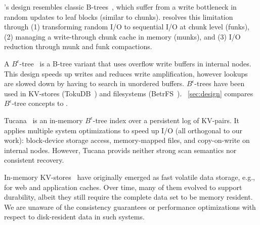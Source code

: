 \sys's design resembles classic B-trees~\cite{Knuth:1998:ACP:280635}, which suffer from a write bottleneck in random updates to 
leaf blocks (similar to chunks). \sys\/ resolves this limitation through (1) transforming random I/O to sequential I/O at chunk level
(funks), (2) managing a write-through chunk cache in memory (munks), and (3) I/O reduction through munk and funk compactions. 

A $B^{\epsilon}$-tree ~\cite{Brodal:2003:LBE:644108.644201}is a B-tree variant that uses overflow write buffers in internal nodes. 
This design speeds up writes and reduces write amplification, however lookups are slowed down by having to search in unordered 
buffers. $B^{\epsilon}$-trees have been used in KV-stores (TokuDB~\cite{TokuDB}) and filesystems (BetrFS~\cite{BetrFS}).  
~\cref{sec:design} compares $B^{\epsilon}$-tree concepts to \sys. 

Tucana~\cite{tucana} is an in-memory $B^{\epsilon}$-tree index over a persistent log of KV-pairs. It applies multiple system
optimizations to speed up I/O (all orthogonal to our work): block-device storage access, memory-mapped files, and copy-on-write 
on internal nodes. However, Tucana provids neither strong scan semantics nor consistent recovery. 

In-memory KV-stores~\cite{ignite, redis, memcached, Srinivasan:2016:AAR:3007263.3007276} have originally emerged as fast volatile 
data storage, e.g., for web and application caches. Over time, many of them evolved to support durability,
albeit they still require the complete data set to be memory resident.
We are unaware of the consistency guarantees or performance optimizations with respect  to disk-resident data in such systems. 

